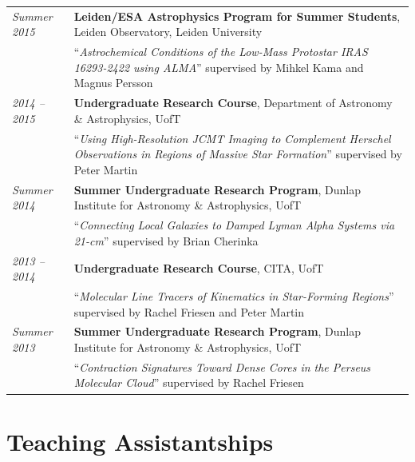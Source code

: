 \documentclass[10pt]{res} %
\begin{document}
\begin{resume}
\begin{table}[h]
\begin{tabularx}{\textwidth}{ @{} p{6.5em} X @{} }
\textit{Summer 2015} & \textbf{Leiden/ESA Astrophysics Program for Summer Students}, Leiden Observatory, Leiden University \\
                                  & ``\textit{Astrochemical Conditions of the Low-Mass Protostar IRAS 16293-2422 using ALMA}'' supervised by Mihkel Kama and Magnus Persson \\
\textit{2014 -- 2015} & \textbf{Undergraduate Research Course}, Department of Astronomy \& Astrophysics, UofT \\
                                 & ``\textit{Using High-Resolution JCMT Imaging to Complement Herschel Observations in Regions of Massive Star Formation}'' supervised by Peter Martin \\
\textit{Summer 2014} & \textbf{Summer Undergraduate Research Program}, Dunlap Institute for Astronomy \& Astrophysics, UofT \\
                                  & ``\textit{Connecting Local Galaxies to Damped Lyman Alpha Systems via 21-cm}'' supervised by Brian Cherinka \\
\textit{2013 -- 2014} &\textbf{Undergraduate Research Course}, CITA, UofT \\
                                 & ``\textit{Molecular Line Tracers of Kinematics in Star-Forming Regions}'' supervised by Rachel Friesen and Peter Martin \\
\textit{Summer 2013} & \textbf{Summer Undergraduate Research Program}, Dunlap Institute for Astronomy \& Astrophysics, UofT \\
                                  & ``\textit{Contraction Signatures Toward Dense Cores in the Perseus Molecular Cloud}'' supervised by Rachel Friesen
\end{tabularx}
\end{table}


\section{\Large Teaching Assistantships}
\vspace{-5pt} %
\noindent\makebox[\linewidth]{\rule{\textwidth}{0.4pt}}
\vspace{-20pt} %


\end{resume}
\end{document}
